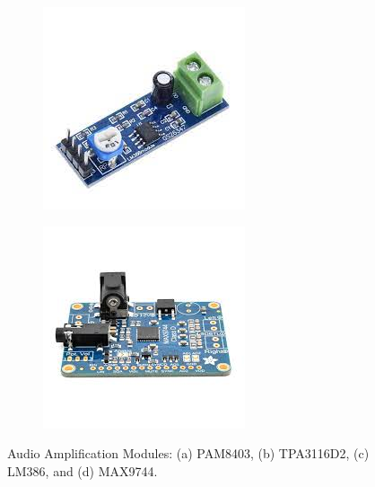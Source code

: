\begin{figure}[h]
\begin{subfigure}[b]{0.22\textwidth}
		\includegraphics[width=\textwidth]{assets/ch2/LM386}
		\caption{}
		\label{fig:lm386}
	\end{subfigure}
	\hfill
	\begin{subfigure}[b]{0.22\textwidth}
		\centering
		\includegraphics[width=\textwidth]{assets/ch2/MAX9744}
		\caption{}
		\label{fig:max9744}
	\end{subfigure}
	\caption{Audio Amplification Modules: (a) PAM8403, (b) TPA3116D2, (c) LM386, and (d) MAX9744.}
	\label{fig:audio_modules}
\end{figure}

